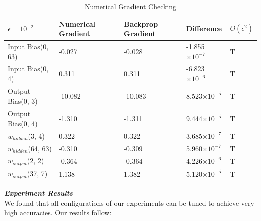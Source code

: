 \documentclass{article} %
\begin{document}
{\renewcommand{\arraystretch}{1.5}
\begin{table}[h!]
\centering
\caption{Numerical Gradient Checking}
\label{my-label}
\begin{tabular}{|l|l|l|l|l|} \hline
$\epsilon = 10^{-2}$ & Numerical Gradient & Backprop Gradient & Difference                           & $O(\epsilon^2)$  \\ \hline
Input Bias(0, 63)                    & -0.027          & -0.028         & -1.855$\times10^{-7}$ & T                             \\ \hline
Input Bias(0, 4)                     & 0.311           & 0.311          & -6.823$\times10^{-6}$     & T                             \\ \hline
Output Bias(0, 3)                    & -10.082         & -10.083       & 8.523$\times10^{-5}$   & T                             \\ \hline
Output Bias(0, 4)                    & -1.310           & -1.311          & 9.444$\times10^{-5}$     & T                             \\ \hline
$w_{hidden}$(3, 4)                  & 0.322           & 0.322          & 3.685$\times10^{-7}$     & T                             \\ \hline
$w_{hidden}$(64, 63)                & -0.310          & -0.309         & 5.960$\times10^{-7}$    & T                             \\ \hline
$w_{output}$(2, 2)                  & -0.364          & -0.364         & 4.226$\times10^{-6}$    & T                             \\ \hline
$w_{output}$(37, 7)                 & 1.138           & 1.382           & 5.120$\times10^{-5}$    & T                             
\\ \hline
\end{tabular}
\end{table}

\newpage

\textbf{\textit{Experiment Results}} \\ 


We found that all configurations of our experiments can be tuned to achieve very high accuracies.  Our results follow:

}
\end{document}
